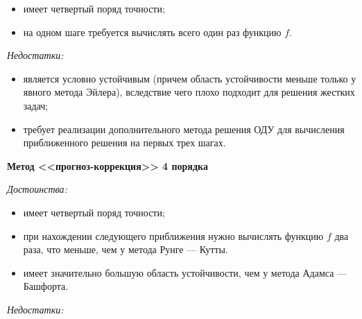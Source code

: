 \documentclass[12pt, a4paper]{article}
\begin{document}
\begin{enumerate}
		\begin{itemize}
			\item имеет четвертый поряд точности;
			\item на одном шаге требуется вычислять всего один раз функцию $f$.
		\end{itemize}
		
		\textit{Недостатки:}
		
		\begin{itemize}
			\item является условно устойчивым (причем область устойчивости меньше только у явного метода Эйлера), вследствие чего плохо подходит для решения жестких задач;
			\item требует реализации дополнительного метода решения ОДУ для вычисления приближенного решения на первых трех шагах.
		\end{itemize}
		
		\textbf{Метод <<прогноз-коррекция>> 4 порядка}
		
		\textit{Достоинства:}
		
		\begin{itemize}
			\item имеет четвертый поряд точности;
			\item при нахождении следующего приближения нужно вычислять функцию $f$ два раза, что меньше, чем у метода Рунге --- Кутты.
			\item имеет значительно большую область устойчивости, чем у метода Адамса --- Башфорта.
		\end{itemize}
		
		\textit{Недостатки:}
		

\end{enumerate}
\end{document}
